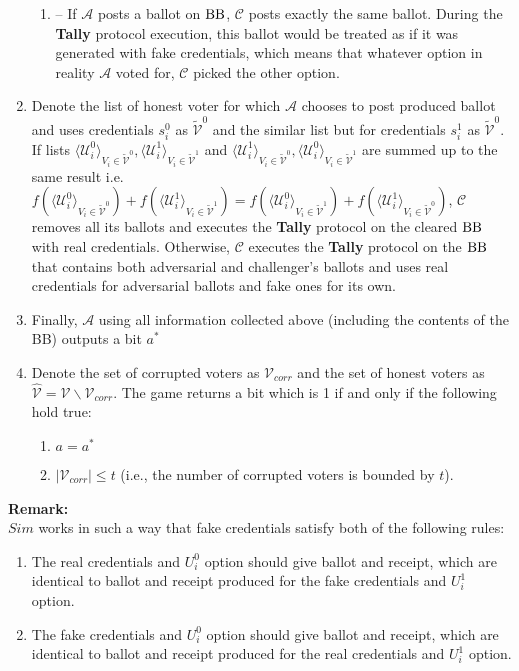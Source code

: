 \begin{enumerate}
\begin{enumerate}
\item[] --  If  $\mathcal{A}$ posts a ballot on $\operatorname{BB}$, $\mathcal{C}$ posts exactly the same ballot. During the \textbf{Tally} protocol execution, this ballot would be treated as if it was generated with fake credentials, which means that whatever option in reality $\mathcal{A}$ voted for, $\mathcal{C}$ picked the other option.  
\end{enumerate}
\item Denote the list of honest voter for which $\mathcal{A}$ chooses to post produced ballot and uses credentials $s_i^0$  as $ \tilde{\mathcal{V}}^0$ and the similar list but for credentials $s_i^1$ as $ \tilde{\mathcal{V}}^0$.  If  lists $\langle \mathcal{U}^0_i \rangle _{V_i \in \tilde{\mathcal{V}}^0}, \langle \mathcal{U}^1_i \rangle _{V_i \in \tilde{\mathcal{V}}^1}$ and $\langle \mathcal{U}^1_i \rangle _{V_i \in \tilde{\mathcal{V}}^0}, \langle \mathcal{U}^0_i \rangle _{V_i \in \tilde{\mathcal{V}}^1}$ are summed up to the same result i.e. $f(\langle \mathcal{U}^0_i \rangle _{V_i \in \tilde{\mathcal{V}}^0} ) + f(\langle \mathcal{U}^1_i \rangle _{V_i \in \tilde{\mathcal{V}}^1} ) =  f(\langle \mathcal{U}^0_i \rangle _{V_i \in \tilde{\mathcal{V}}^1} ) +  f(\langle \mathcal{U}^1_i \rangle _{V_i \in \tilde{\mathcal{V}}^0} )$, $\mathcal{C}$ removes all its ballots and executes the \textbf{Tally} protocol on the cleared $\operatorname{BB}$ with real credentials. Otherwise, $\mathcal{C}$ executes the \textbf{Tally} protocol on the $\operatorname{BB}$ that contains both adversarial and challenger's ballots and uses real credentials for adversarial ballots and fake ones for its own. 
\item Finally, $\mathcal{A}$ using all information collected above (including the contents of the BB) outputs a bit $a^*$
\item Denote the set of corrupted voters as $\mathcal{V}_{corr}$ and the set of honest voters as $\hat{\mathcal{V}}= \mathcal{V} \backslash \mathcal{V}_{corr}$. The game returns a bit which is 1 if and only if the following hold true:
\begin{enumerate}
 \item $a = a^*$
 \item $|\mathcal{V}_{corr}| \leq t$ (i.e., the number of corrupted voters is bounded by $t$).
\end{enumerate} 
\end{enumerate}

\textbf{Remark:}\\
$Sim$ works in such a way that fake credentials satisfy both of the following rules: 
\begin{enumerate}
 \item The real credentials and $U_i^0$ option  should give ballot and receipt, which are identical to ballot and receipt produced for the fake credentials and  $U_i^1$ option.
 \item The fake credentials and $U_i^0$ option  should give ballot and receipt, which are identical to ballot and receipt produced for the real credentials and  $U_i^1$ option.
 \end{enumerate}

